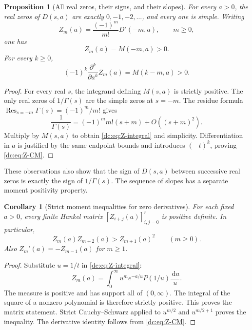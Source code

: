 \documentclass[11pt,a4paper,oneside,openany]{book}
\numberwithin{equation}{chapter}
\newtheorem{proposition}[theorem]{Proposition}
\newtheorem{corollary}[theorem]{Corollary}
\theoremstyle{definition}
\theoremstyle{remark}
\newcommand{\dd}{\,\mathrm d}
\begin{document}
\begin{proposition}[All real zeros, their signs, and their slopes]
\label{dc:prop:real-zeros}
For every $a>0$, the real zeros of $D(s,a)$ are exactly
$0,-1,-2,\ldots$, and every one is simple. Writing
\begin{equation}
 Z_m(a)=\frac{(-1)^m}{m!}D'(-m,a),\qquad m\ge0,
 \label{dc:eq:Z-def}
\end{equation}
one has
\begin{equation}
 \boxed{Z_m(a)=M(-m,a)>0.}
 \label{dc:eq:Z-integral}
\end{equation}
For every $k\ge0$,
\begin{equation}
 (-1)^k\frac{\partial^k}{\partial a^k}Z_m(a)
   =M(k-m,a)>0.
 \label{dc:eq:Z-CM}
\end{equation}
\end{proposition}
\begin{proof}
For every real $s$, the integrand defining $M(s,a)$ is strictly
positive. The only real zeros of $1/\Gamma(s)$ are the simple zeros
at $s=-m$. The residue formula
$\operatorname{Res}_{s=-m}\Gamma(s)=(-1)^m/m!$ gives
\[
 \frac1{\Gamma(s)}=(-1)^m m!(s+m)+O((s+m)^2).
\]
Multiply by $M(s,a)$ to obtain \cref{dc:eq:Z-integral} and simplicity.
Differentiation in $a$ is justified by the same endpoint bounds and
introduces $(-t)^k$, proving \cref{dc:eq:Z-CM}.
\end{proof}

These observations also show that the sign of $D(s,a)$ between
successive real zeros is exactly the sign of $1/\Gamma(s)$.
The sequence of slopes has a separate moment positivity property.

\begin{corollary}[Strict moment inequalities for zero derivatives]
\label{dc:cor:Z-Hankel}
For each fixed $a>0$, every finite Hankel matrix
$[Z_{i+j}(a)]_{i,j=0}^{r}$ is positive definite. In particular,
\begin{equation}
 Z_m(a)Z_{m+2}(a)>Z_{m+1}(a)^2\qquad(m\ge0).
 \label{dc:eq:Z-logconvex}
\end{equation}
Also $Z_m'(a)=-Z_{m-1}(a)$ for $m\ge1$.
\end{corollary}
\begin{proof}
Substitute $u=1/t$ in \cref{dc:eq:Z-integral}:
\[
 Z_m(a)=\int_0^\infty u^m e^{-a/u}P(1/u)\frac{\dd u}{u}.
\]
The measure is positive and has support all of $(0,\infty)$.
The integral of the square of a nonzero polynomial is therefore
strictly positive. This proves the matrix statement. Strict
Cauchy--Schwarz applied to $u^{m/2}$ and $u^{m/2+1}$ proves the
inequality. The derivative identity follows from
\cref{dc:eq:Z-CM}.
\end{proof}
\end{document}
